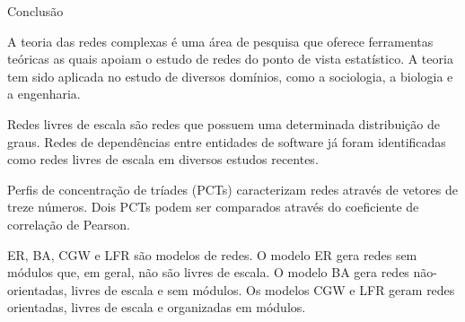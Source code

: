 \begin{section}{Conclusão} %
	
	A teoria das redes complexas é uma área de pesquisa que oferece ferramentas teóricas as quais apoiam o estudo de redes do ponto de vista estatístico. A teoria tem sido aplicada no estudo de diversos domínios, como a sociologia, a biologia e a engenharia.
	
	Redes livres de escala são redes que possuem uma determinada distribuição de graus. Redes de dependências entre entidades de software já foram identificadas como redes livres de escala em diversos estudos recentes.
	
	Perfis de concentração de tríades (PCTs) caracterizam redes através de vetores de treze números. Dois PCTs podem ser comparados através do coeficiente de correlação de Pearson.
	
	ER, BA, CGW e LFR são modelos de redes. O modelo ER gera redes sem módulos que, em geral, não são livres de escala. O modelo BA gera redes não-orientadas, livres de escala e sem módulos. Os modelos CGW e LFR geram redes orientadas, livres de escala e organizadas em módulos.
		
\end{section}
